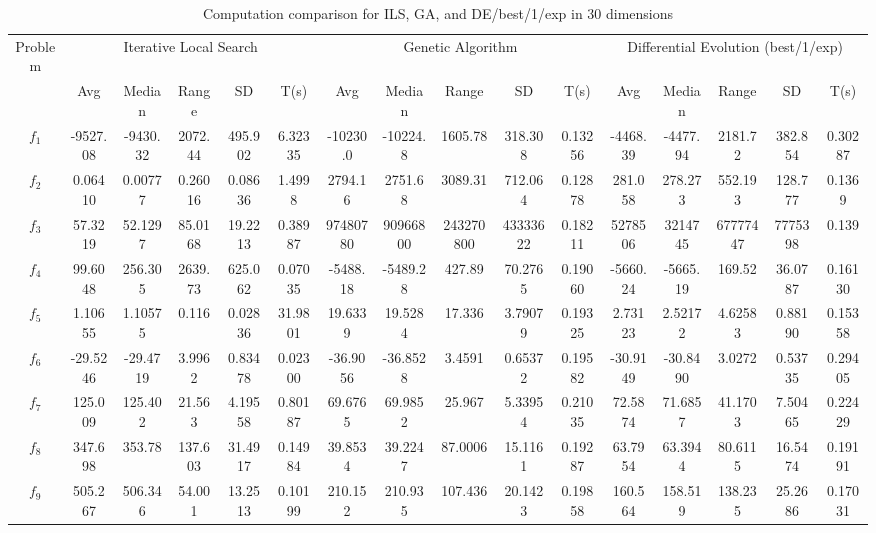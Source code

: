 \documentclass[paper=a4, fontsize=11pt]{scrartcl} %
\numberwithin{equation}{section} %
\numberwithin{figure}{section} %
\numberwithin{table}{section} %
\begin{document}
\begin{landscape}
	\begin{table}
		\tiny
		\centering
		\caption{Computation comparison for ILS, GA, and DE/best/1/exp in 30 dimensions}
		\label{Tab1d}
		\begin{tabular}{c|ccccc|ccccc|ccccc}
			\noalign{\smallskip}\hline\noalign{\smallskip}
			Problem & \multicolumn{5}{c}{Iterative Local Search}& \multicolumn{5}{|c|}{Genetic Algorithm}
			&  \multicolumn{5}{c}{Differential Evolution (best/1/exp)} \\ 
			\noalign{\smallskip}\hline\noalign{\smallskip}
			& Avg & Median & Range & SD & T(s) & Avg & Median
			& Range & SD & T(s) & Avg & Median & Range & SD &
			T(s) \\ 
			\noalign{\smallskip}\hline\noalign{\smallskip}
			$f_{1}$  & -9527.08 & -9430.32 & 2072.44 & 495.902 & 6.32335 & -10230.0 & -10224.8 & 1605.78 & 318.308 & 0.13256 & -4468.39 & -4477.94 & 2181.72 & 382.854 & 0.30287\\
			$f_{2}$  &  0.06410 &  0.00777 & 0.26016 & 0.08636 & 1.4998  &  2794.16 &  2751.68 & 3089.31 & 712.064 & 0.12878 &  281.058 &  278.273 & 552.193 & 128.777 & 0.1369 \\
			$f_{3}$  &  57.3219 &  52.1297 & 85.0168 & 19.2213 & 0.38987 & 97480780 & 90966800 & 243270800 & 43333622 & 0.18211 & 5278506 & 3214745 & 67777447 & 7775398 & 0.139\\
			$f_{4}$  &  99.6048 &  256.305 & 2639.73 & 625.062 & 0.07035 & -5488.18 & -5489.28 & 427.89  & 70.2765 & 0.19060 & -5660.24 & -5665.19 & 169.52  & 36.0787 & 0.16130\\
			$f_{5}$  &  1.10655 &  1.10575 & 0.116   & 0.02836 & 31.9801 &  19.6339 &  19.5284 & 17.336  & 3.79079 & 0.19325 &  2.73123 &  2.52172 & 4.62583 & 0.88190 & 0.15358\\
			$f_{6}$  & -29.5246 & -29.4719 & 3.9962  & 0.83478 & 0.02300 & -36.9056 & -36.8528 & 3.4591  & 0.65372 & 0.19582 & -30.9149 & -30.8490 & 3.0272  & 0.53735 & 0.29405\\
			$f_{7}$  &  125.009 &  125.402 & 21.563  & 4.19558 & 0.80187 &  69.6765 &  69.9852 & 25.967  & 5.33954 & 0.21035 &  72.5874 &  71.6857 & 41.1703 & 7.50465 & 0.22429\\
			$f_{8}$  &  347.698 &  353.78  & 137.603 & 31.4917 & 0.14984 &  39.8534 &  39.2247 & 87.0006 & 15.1161 & 0.19287 &  63.7954 &  63.3944 & 80.6115 & 16.5474 & 0.19191\\
			$f_{9}$  &  505.267 &  506.346 & 54.001  & 13.2513 & 0.10199 &  210.152 &  210.935 & 107.436 & 20.1423 & 0.19858 &  160.564 &  158.519 & 138.235 & 25.2686 & 0.17031\\

\end{tabular}
\end{table}
\end{landscape}
\end{document}
